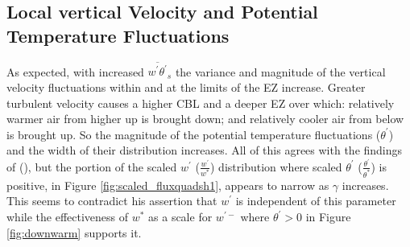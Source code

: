 
\subsection{Local vertical Velocity and Potential Temperature Fluctuations}

As expected, with increased $\overline{w^{'}\theta^{'}}_{s}$ the variance and magnitude of the vertical velocity fluctuations within and at the limits of the \acs{EZ} increase.  Greater turbulent velocity causes a higher \acs{CBL} and a deeper \acs{EZ} over which: relatively warmer air from higher up is brought down; and relatively cooler air from below is brought up.  So the magnitude of the potential temperature fluctuations ($\theta^{'}$) and the width of their distribution increases. All of this agrees with the findings of \citeauthor{Sorbjan} (\citeyear{Sorbjan}), but the portion of the scaled $w^{'}$ ($\frac{w^{'}}{w^{*}}$) distribution where scaled $\theta^{'}$ ($\frac{\theta^{'}}{\theta^{*}}$) is positive, in Figure \ref{fig:scaled_fluxquadsh1}, appears to narrow as $\gamma$ increases. This seems to contradict his assertion that $w^{'}$ is independent of this parameter while the effectiveness of $w^{*}$ as a scale for $w^{'-}$ where $\theta^{'}>0$ in Figure \ref{fig:downwarm} supports it.\\

